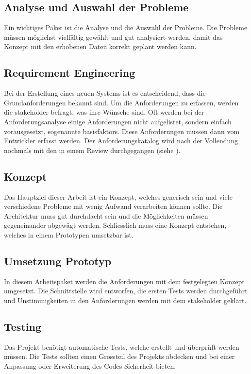 \subsection{Analyse und Auswahl der Probleme}\label{analyse_auswahl_probleme}
Ein wichtiges Paket ist die Analyse und die Auswahl der Probleme. Die Probleme müssen möglichst vielfältig gewählt und gut analysiert werden, damit das Konzept 
mit den erhobenen Daten korrekt geplant werden kann.

\subsection{Requirement Engineering}\label{rqe}
Bei der Erstellung eines neuen Systems ist es entscheidend, dass die Grundanforderungen bekannt sind. Um die Anforderungen zu erfassen, werden die \gls{stakeholder} befragt, was ihre 
Wünsche sind. Oft werden bei der Anforderungsanalyse einige Anforderungen nicht aufgelistet, sondern einfach vorausgesetzt, sogenannte \glspl{basisfaktor}. Diese Anforderungen müssen 
dann vom Entwickler erfasst werden. Der Anforderungskatalog wird nach der Vollendung nochmals mit den  in einem Review durchgegangen (siehe 
\cite{req_eng_book}).

\subsection{Konzept}\label{ref_backend}
Das Hauptziel dieser Arbeit ist ein Konzept, welches generisch sein und viele verschiedene Probleme mit wenig Aufwand verarbeiten können sollte. Die Architektur muss gut durchdacht sein und 
die Möglichkeiten müssen gegeneinander abgewägt werden. Schliesslich muss eine Konzept entstehen, welches in einem Prototypen umsetzbar ist.

\subsection{Umsetzung Prototyp}\label{eng_prototyp}
In diesem Arbeitspaket werden die Anforderungen mit dem festgelegten Konzept umgesetzt. Die Schnittstelle wird entworfen, die ersten Tests werden durchgeführt und Unstimmigkeiten in den 
Anforderungen werden mit dem \gls{stakeholder} geklärt.

\subsection{Testing}\label{testing}
Das Projekt benötigt automatische Tests, welche erstellt und überprüft werden müssen. Die Tests sollten einen Grossteil des Projekts abdecken und bei einer Anpassung oder Erweiterung des 
Codes Sicherheit bieten.

